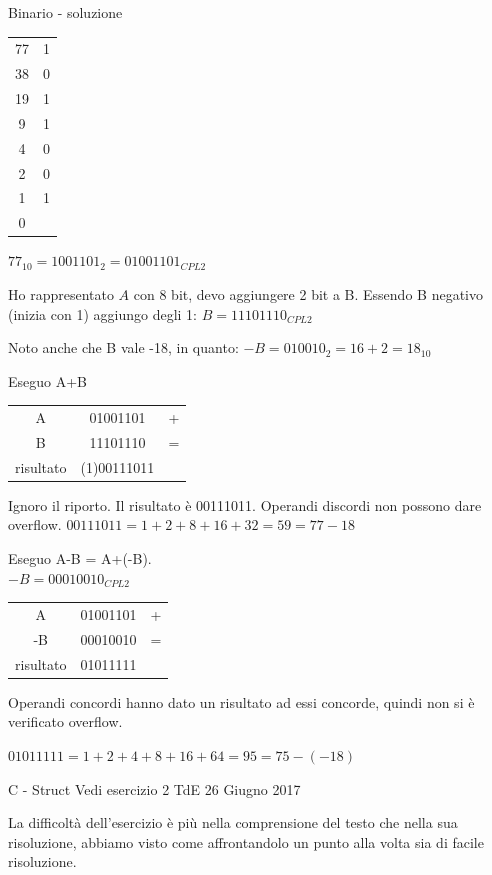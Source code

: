 \documentclass[handout]{beamer}
\begin{document}
\begin{frame}[allowframebreaks]{Binario - soluzione}
	\begin{tabular}{c|c}
		77 & 1\\
		38 & 0\\
		19 & 1\\
		9 & 1\\
		4 & 0\\
		2 & 0\\
		1 & 1\\
		0 &
	\end{tabular}
	$77_{10} = 1001101_2 = 01001101_{CPL2}$
	
	Ho rappresentato $A$ con 8 bit, devo aggiungere 2 bit a B. Essendo B negativo (inizia con 1) aggiungo degli 1: $B=11101110_{CPL2}$
	
	Noto anche che B vale -18, in quanto: $-B=010010_2=16+2=18_{10}$
	
	\framebreak
	Eseguo A+B
	
	\begin{tabular}{cc|c}
		A			& 01001101 & + \\
		B			& 11101110 & = \\
		\hline
		risultato	&\hspace{-0.5cm}(1)00111011 &  \\
	\end{tabular}

	Ignoro il riporto. Il risultato è 00111011. Operandi discordi non possono dare overflow.
	$00111011 = 1+2+8+16+32=59=77-18$
	
	\framebreak
	
	Eseguo A-B = A+(-B).\\
	$-B = 00010010_{CPL2}$
	
	\begin{tabular}{cc|c}
		A			& 01001101 & + \\
		-B			& 00010010 & = \\
		\hline
		risultato	& 01011111 &  \\
	\end{tabular}
	
	Operandi concordi hanno dato un risultato ad essi concorde, quindi non si è verificato overflow.
	
	$01011111 = 1+2+4+8+16+64=95=75-(-18)$
	
\end{frame}


\begin{frame}{C - Struct}
	Vedi esercizio 2 TdE 26 Giugno 2017
	
	La difficoltà dell'esercizio è più nella comprensione del testo che nella sua risoluzione, abbiamo visto come affrontandolo un punto alla volta sia di facile risoluzione.
\end{frame}
\end{document}
